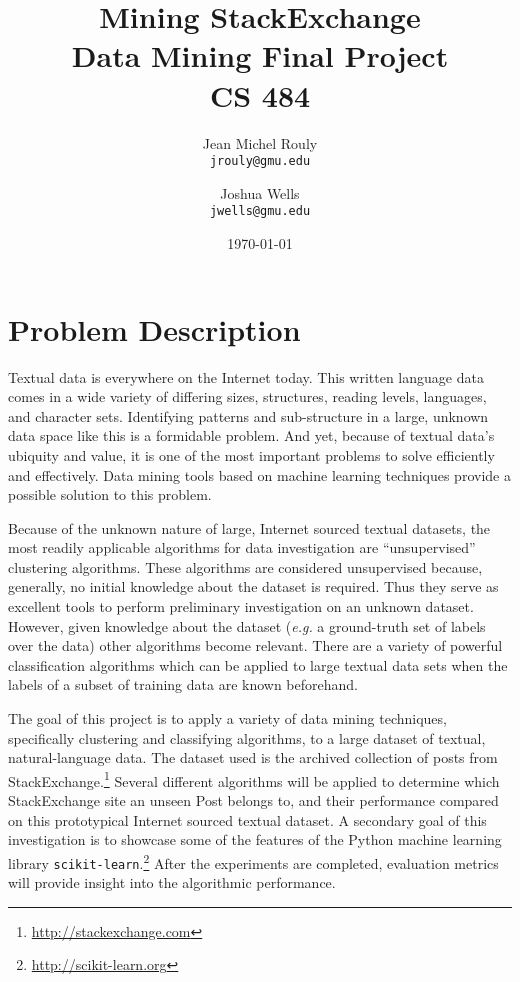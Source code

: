 \documentclass[letterpaper,10pt]{article}
\title{
  \Huge\textbf{Mining StackExchange} \\
  \LARGE Data Mining Final Project \\
  CS 484 \\
}
\author{
  Jean Michel Rouly\\
  \texttt{jrouly@gmu.edu}
  \and
  Joshua Wells\\
  \texttt{jwells@gmu.edu}
}
\date{\today}
\begin{document}
\maketitle


\section{Problem Description}

Textual data is everywhere on the Internet today. This written language
data comes in a wide variety of differing sizes, structures, reading
levels, languages, and character sets. Identifying patterns and
sub-structure in a large, unknown data space like this is a formidable
problem. And yet, because of textual data's ubiquity and value, it is one
of the most important problems to solve efficiently and effectively. Data
mining tools based on machine learning techniques provide a possible
solution to this problem.

Because of the unknown nature of large, Internet sourced textual
datasets, the most readily applicable algorithms for data investigation
are ``unsupervised'' clustering algorithms. These algorithms are
considered unsupervised because, generally, no initial knowledge about
the dataset is required. Thus they serve as excellent tools to perform
preliminary investigation on an unknown dataset. However, given knowledge
about the dataset (\textit{e.g.} a ground-truth set of labels over the
data) other algorithms become relevant. There are a variety of powerful
classification algorithms which can be applied to large textual data sets
when the labels of a subset of training data are known beforehand.

The goal of this project is to apply a variety of data mining techniques,
specifically clustering and classifying algorithms, to a large dataset of
textual, natural-language data. The dataset used is the archived collection
of posts from StackExchange.\footnote{\url{http://stackexchange.com}}
Several different algorithms will be applied to determine which
StackExchange site an unseen Post belongs to, and their performance
compared on this prototypical Internet sourced textual dataset. A secondary
goal of this investigation is to showcase some of the features of the
Python machine learning library
\texttt{scikit-learn}.\footnote{\url{http://scikit-learn.org}} After the
experiments are completed, evaluation metrics will provide insight into the
algorithmic performance.
\end{document}
